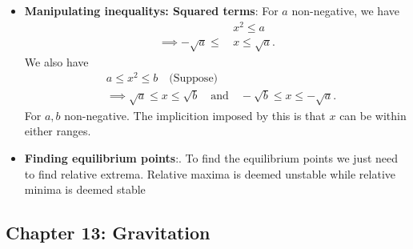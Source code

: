 \documentclass{report}
\begin{document}
\begin{itemize}
    \item \textbf{Manipulating inequalitys: Squared terms}: For $a$ non-negative, we have
        \begin{align*}
            &x^{2} \leq a \\
            \implies -\sqrt{a} \leq\, &x \leq \sqrt{a}
        .\end{align*}
        \bigbreak \noindent 
        We also have
        \begin{align*}
           &a \leq x^{2} \leq b \quad \text{(Suppose)} \\
           &\implies \sqrt{a} \leq x \leq \sqrt{b} \quad \text{and} \quad -\sqrt{b} \leq x \leq -\sqrt{a}
        .\end{align*}
        \bigbreak \noindent 
        For $a,b$ non-negative. The implicition imposed by this is that $x$ can be within either ranges.

    \item \textbf{Finding equilibrium points}:. To find the equilibrium points we just need to find relative extrema. Relative maxima is deemed unstable while relative minima is deemed stable

    \end{itemize}

    \pagebreak 
    \subsection{Chapter 13: Gravitation}
    \bigbreak \noindent 
\end{document}
